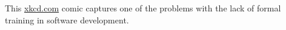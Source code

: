 \label{fig:xkcd}

This \href{https://xkcd.com/1513/}{xkcd.com} comic captures one of the problems with the lack of formal training in software development.
  
  
  
  